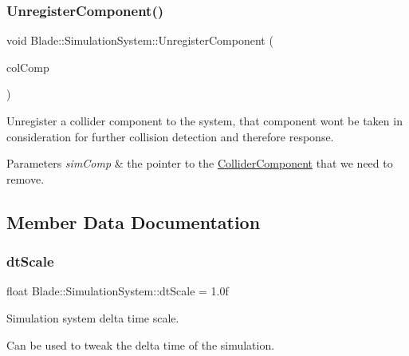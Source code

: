 \subsubsection{\texorpdfstring{Unregister\+Component()}{UnregisterComponent()}\hspace{0.1cm}{\footnotesize\ttfamily [2/2]}}
{\footnotesize\ttfamily void Blade\+::\+Simulation\+System\+::\+Unregister\+Component (\begin{DoxyParamCaption}\item[{\hyperlink{class_blade_1_1_collider_component}{Collider\+Component} $\ast$}]{col\+Comp }\end{DoxyParamCaption})\hspace{0.3cm}{\ttfamily [noexcept]}}



Unregister a collider component to the system, that component won\textquotesingle{}t be taken in consideration for further collision detection and therefore response. 


\begin{DoxyParams}{Parameters}
{\em sim\+Comp} & the pointer to the \hyperlink{class_blade_1_1_collider_component}{Collider\+Component} that we need to remove. \\
\hline
\end{DoxyParams}


\subsection{Member Data Documentation}
\mbox{\label{class_blade_1_1_simulation_system_ad7c3441e3a8a9b97fbdd12ec936b963e}} 
\subsubsection{\texorpdfstring{dt\+Scale}{dtScale}}
{\footnotesize\ttfamily float Blade\+::\+Simulation\+System\+::dt\+Scale = 1.\+0f\hspace{0.3cm}{\ttfamily [static]}}



Simulation system delta time scale. 

Can be used to tweak the delta time of the simulation. \mbox{\label{class_blade_1_1_simulation_system_aa7d0bb11aafd59e102723b08271c7d9e}} 
